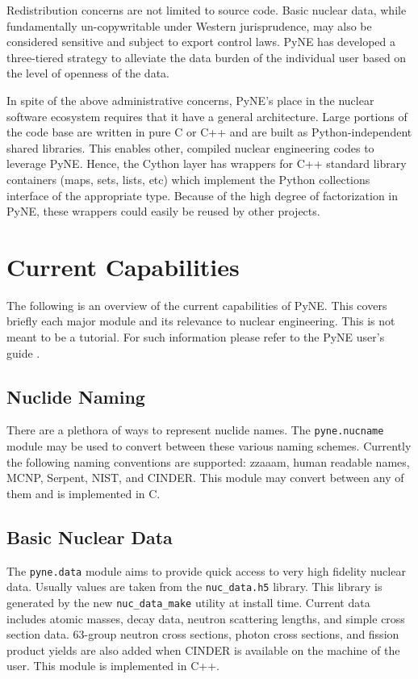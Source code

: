 \documentclass{anstrans}
\begin{document}
Redistribution concerns are not limited to source code.  Basic nuclear data,
while fundamentally un-copywritable under Western jurisprudence, may also be
considered sensitive and subject to export control laws.  PyNE has developed a
three-tiered strategy to alleviate the data burden of the individual user based
on the level of openness of the data.

In spite of the above administrative concerns, PyNE's place in the nuclear
software ecosystem requires that it have a general architecture.  Large portions
of the code base are written in pure C or C++ and are built as
Python-independent shared libraries.  This enables other, compiled nuclear
engineering codes to leverage PyNE.  Hence, the Cython layer has wrappers for
C++ standard library containers (maps, sets, lists, etc) which implement the
Python collections interface of the appropriate type.  Because of the high
degree of factorization in PyNE, these wrappers could easily be reused by other
projects.


\section{Current Capabilities}

The following is an overview of the current capabilities of PyNE.  This covers
briefly each major module and its relevance to nuclear engineering.  This is not
meant to be a tutorial.  For such information please refer to the PyNE user's
guide \cite{PyNE:2012}.

\subsection{Nuclide Naming} 
There are a plethora of ways to represent nuclide names.  The
\texttt{pyne.nucname} module may be used to convert between these various naming
schemes. Currently the following naming conventions are supported: zzaaam, human
readable names, MCNP, Serpent, NIST, and CINDER.  This module may convert
between any of them and is implemented in C.


\subsection{Basic Nuclear Data}
The \texttt{pyne.data} module aims to provide quick access to very high fidelity
nuclear data. Usually values are taken from the \texttt{nuc\_data.h5} library.
This library is generated by the new \texttt{nuc\_data\_make} utility at install
time.  Current data includes atomic masses, decay data, neutron scattering
lengths, and simple cross section data. 63-group neutron cross sections, photon
cross sections, and fission product yields are also added when CINDER is
available on the machine of the user.  This module is implemented in C++.
\end{document}
